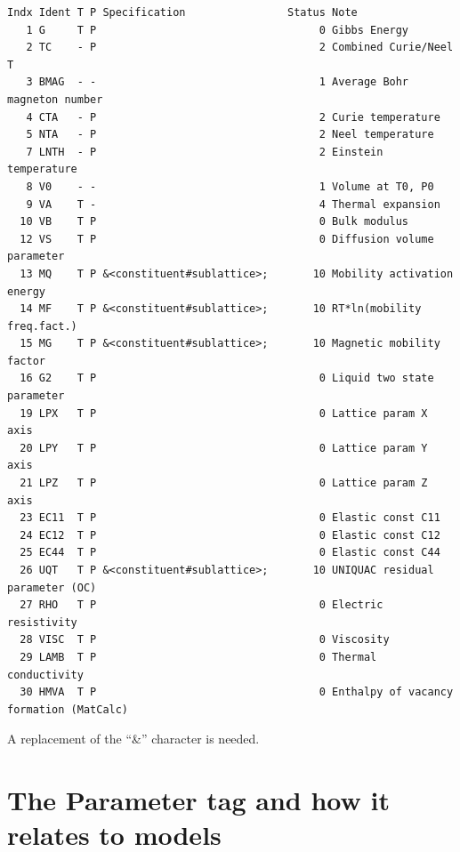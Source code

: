 \documentclass{article}
\begin{document}
\begin{appendices}
\begin{table}[!h]
{\small
\begin{verbatim}
Indx Ident T P Specification                Status Note
   1 G     T P                                   0 Gibbs Energy
   2 TC    - P                                   2 Combined Curie/Neel T
   3 BMAG  - -                                   1 Average Bohr magneton number
   4 CTA   - P                                   2 Curie temperature
   5 NTA   - P                                   2 Neel temperature
   7 LNTH  - P                                   2 Einstein temperature
   8 V0    - -                                   1 Volume at T0, P0
   9 VA    T -                                   4 Thermal expansion
  10 VB    T P                                   0 Bulk modulus
  12 VS    T P                                   0 Diffusion volume parameter
  13 MQ    T P &<constituent#sublattice>;       10 Mobility activation energy
  14 MF    T P &<constituent#sublattice>;       10 RT*ln(mobility freq.fact.)
  15 MG    T P &<constituent#sublattice>;       10 Magnetic mobility factor
  16 G2    T P                                   0 Liquid two state parameter
  19 LPX   T P                                   0 Lattice param X axis
  20 LPY   T P                                   0 Lattice param Y axis
  21 LPZ   T P                                   0 Lattice param Z axis
  23 EC11  T P                                   0 Elastic const C11
  24 EC12  T P                                   0 Elastic const C12
  25 EC44  T P                                   0 Elastic const C44
  26 UQT   T P &<constituent#sublattice>;       10 UNIQUAC residual parameter (OC)
  27 RHO   T P                                   0 Electric resistivity
  28 VISC  T P                                   0 Viscosity
  29 LAMB  T P                                   0 Thermal conductivity
  30 HMVA  T P                                   0 Enthalpy of vacancy formation (MatCalc)
\end{verbatim}
  }
\end{table}

A replacement of the ``\&'' character is needed.

\newpage 

\setcounter{equation}{0}
\renewcommand{\theequation}{C\arabic{equation}}
\setcounter{figure}{0}
\renewcommand{\thefigure}{C\arabic{figure}}

\section{The Parameter tag and how it relates to models}\label{sec:partags}


\end{appendices}
\end{document}
